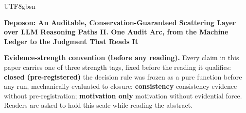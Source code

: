 \documentclass[11pt,letterpaper]{article}
\begin{document}
\begin{CJK}{UTF8}{gbsn}
\begin{center}
{\LARGE\bfseries Deposon: An Auditable, Conservation-Guaranteed Scattering Layer over LLM Reasoning Paths \textemdash{} II. One Audit Arc, from the Machine Ledger to the Judgment That Reads It\par}
\end{center}
\vspace{0.8em}
\textbf{Evidence-strength convention (before any reading).} Every claim in this paper carries one of three strength tags, fixed before the reading it qualifies: \textbf{closed (pre-registered)} \textemdash{} the decision rule was frozen as a pure function before any run, mechanically evaluated to closure; \textbf{consistency} \textemdash{} consistency evidence without pre-registration; \textbf{motivation only} \textemdash{} motivation without evidential force. Readers are asked to hold this scale while reading the abstract.


\end{CJK}
\end{document}
